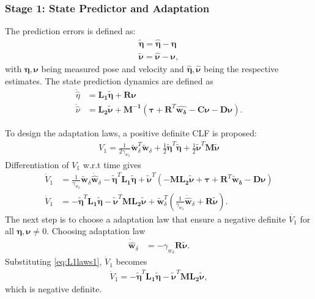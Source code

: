 

\subsubsection{Stage 1: State Predictor and Adaptation}
\noindent
The prediction errors is defined as:
\begin{align}\label{prederror}
\boldsymbol{\tilde{\eta} = \hat{\eta} - \eta} \\
\boldsymbol{\tilde{\nu} = \hat{\nu} - \nu},
\end{align}
with $\boldsymbol{\eta, \nu}$ being measured pose and velocity and $\boldsymbol{\hat{\eta}, \hat{\nu}}$ being the respective estimates. The state prediction dynamics are defined as 
\begin{align}
\dot{\hat{\eta}} &= \boldsymbol{L_1\tilde{\eta} + R\nu}\\
\dot{\hat{\nu}} &= \boldsymbol{L_2\tilde{\nu} + M^{-1}}(\boldsymbol{\tau + R}^T\boldsymbol{\hat{w_{\delta}}-C\nu}-\boldsymbol{D\nu}).
\end{align}


To design the adaptation laws, a positive definite CLF is proposed:
\begin{align}\label{eq:L1ABV1}
V_1 =  \frac{1}{2\gamma_{w_{\delta}}} \tilde{\boldsymbol{w}}_{\delta}^T\tilde{\boldsymbol{w}}_{\delta} + \frac{1}{2}\tilde{\boldsymbol{\eta}}^T\tilde{\boldsymbol{\eta}} + \frac{1}{2}\tilde{\boldsymbol{\nu}}^T\boldsymbol{M}\tilde{\boldsymbol{\nu}}
\end{align} 
Differentiation of $V_1$ w.r.t time gives 
\begin{align}\label{eq: L1V1dot}
\dot{V}_1 &=  \frac{1}{\gamma_{w_{\delta}}}\tilde{\boldsymbol{w}}_{\delta}\dot{\hat{\boldsymbol{w}}}_{\delta} -\tilde{\boldsymbol{\eta}}^T\boldsymbol{L_1}\tilde{\boldsymbol{\eta}}+ \tilde{\boldsymbol{\nu}}^T(-\boldsymbol{ML_2}\tilde{\boldsymbol{\nu}}+ \boldsymbol{\tau} + \boldsymbol{R}^T\boldsymbol{\tilde{w}_{\delta}} -\boldsymbol{D\nu}) \\
\dot{V}_1 &= -\tilde{\boldsymbol{\eta}}^T\boldsymbol{L_1}\tilde{\boldsymbol{\eta}} -\boldsymbol{\tilde{\nu}}^{T} \boldsymbol{ML_2\tilde{\nu}}+ \tilde{\boldsymbol{w}}_{\delta}^T(\frac{1}{\gamma_{w_{\delta}}}\dot{\hat{\boldsymbol{w}}}_{\delta}+\boldsymbol{R\tilde{\nu}}).
\end{align}
The next step is to choose a adaptation law that ensure a negative definite $\dot{V_1}$ for all $\boldsymbol{\eta}, \boldsymbol{\nu} \neq 0$. 
Choosing adaptation law
\begin{align}\label{eq:L1laws1}
\dot{\hat{\boldsymbol{w}}}_{\delta} &= -\gamma_{w_{\delta}}\boldsymbol{R\tilde{\nu}}.
\end{align}
Substituting \eqref{eq:L1laws1}, $\dot{V}_1$ becomes 
\begin{align}
\dot{V}_1 = -\tilde{\boldsymbol{\eta}}^T\boldsymbol{L_1}\tilde{\boldsymbol{\eta}} -\boldsymbol{\tilde{\nu}}^{T} \boldsymbol{ML_2\tilde{\nu}},
\end{align}which is negative definite. \\


